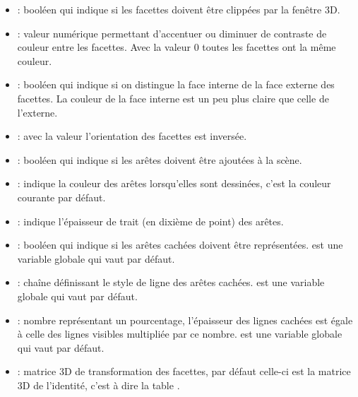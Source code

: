 \begin{itemize}
        \item {} : booléen qui indique si les facettes doivent être clippées par la fenêtre 3D.
        \item {} : valeur numérique permettant d'accentuer ou diminuer de contraste de couleur entre les facettes. Avec la valeur $0$ toutes les facettes ont la même couleur.
        
        \item {} : booléen qui indique si on distingue la face interne de la face externe des facettes. La couleur de la face interne est un peu plus claire que celle de l'externe.
        
        \item {} : avec la valeur \true l'orientation des facettes est inversée.
        
        \item {} : booléen qui indique si les arêtes doivent être ajoutées à la scène.
        
        \item {} : indique la couleur des arêtes lorsqu'elles sont dessinées, c'est la couleur courante par défaut.
        
        \item {}: indique l'épaisseur de trait (en dixième de point) des arêtes.
        \item {} : booléen qui indique si les arêtes cachées doivent être représentées.  est une variable globale qui vaut \false par défaut.
        
        \item {} : chaîne définissant le style de ligne des arêtes cachées.  est une variable globale qui vaut  par défaut.
        
        \item {} : nombre représentant un pourcentage, l'épaisseur des lignes cachées est égale à celle des lignes visibles multipliée par ce nombre.  est une variable globale qui vaut  par défaut.
        
        \item {} : matrice 3D de transformation des facettes, par défaut celle-ci est la matrice 3D de l'identité, c'est à dire la table .
    \end{itemize}

